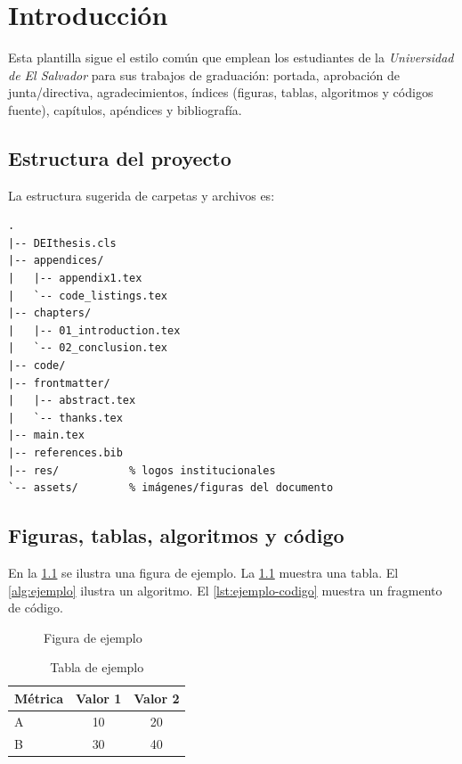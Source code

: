 \chapter{Introducción}
Esta plantilla sigue el estilo común que emplean los estudiantes de la \textit{Universidad de El Salvador} para sus trabajos de graduación: portada, aprobación de junta/directiva, agradecimientos, índices (figuras, tablas, algoritmos y códigos fuente), capítulos, apéndices y bibliografía.

\section{Estructura del proyecto}
La estructura sugerida de carpetas y archivos es:
\begin{verbatim}
.
|-- DEIthesis.cls
|-- appendices/
|   |-- appendix1.tex
|   `-- code_listings.tex
|-- chapters/
|   |-- 01_introduction.tex
|   `-- 02_conclusion.tex
|-- code/
|-- frontmatter/
|   |-- abstract.tex
|   `-- thanks.tex
|-- main.tex
|-- references.bib
|-- res/           % logos institucionales
`-- assets/        % imágenes/figuras del documento
\end{verbatim}

\section{Figuras, tablas, algoritmos y código}
En la \cref{fig:ejemplo-figura} se ilustra una figura de ejemplo. La \cref{tab:ejemplo-tabla} muestra una tabla. El \cref{alg:ejemplo} ilustra un algoritmo. El \cref{lst:ejemplo-codigo} muestra un fragmento de código.

\begin{figure}[H]
  \centering
  \fbox{\rule{0pt}{4cm}\rule{6cm}{0pt}} %
  \caption{Figura de ejemplo}\label{fig:ejemplo-figura}
\end{figure}

\begin{table}[H]
  \centering
  \caption{Tabla de ejemplo}\label{tab:ejemplo-tabla}
  \begin{tabular}{lcc}
    \toprule
    Métrica & Valor 1 & Valor 2 \\
    \midrule
    A & 10 & 20 \\
    B & 30 & 40 \\
    \bottomrule
  \end{tabular}
\end{table}


